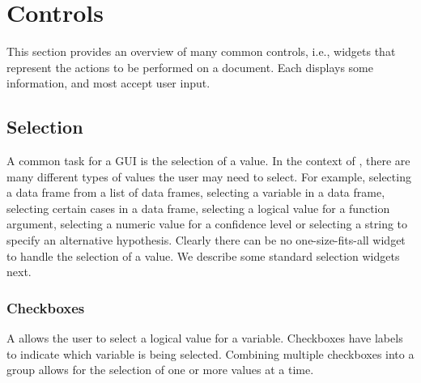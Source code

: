 \section{Controls}
\label{sec:GUI:basic-components}
This section provides an overview of many common controls, i.e.,
widgets that represent the actions to be performed on a document. Each
displays some information, and most accept user input.

\subsection{Selection}
\label{sec:GUI:basic-selection}

A common task for a GUI is the selection of a value. In the context of
\R\/, there are many different types of values the user may need to
select. For example, selecting a data frame from a list of data
frames, selecting a variable in a data frame, selecting certain cases
in a data frame, selecting a logical value for a function argument,
selecting a numeric value for a confidence level or selecting a string
to specify an alternative hypothesis. Clearly there can be no
one-size-fits-all widget to handle the selection of a value. We
describe some standard selection widgets next. 



\subsubsection{Checkboxes}
\label{sec:GUI:checkboxes}

A  allows the user to select a logical value for a
variable. Checkboxes have labels to indicate which variable is being
selected. Combining multiple checkboxes into a group
allows for the selection of one or more values at a time.  

